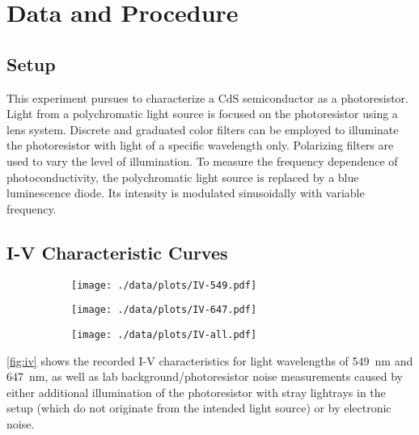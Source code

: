 \chapter{Data and Procedure}

\section{Setup}
This experiment pursues to characterize a CdS semiconductor as a photoresistor.
Light from a polychromatic light source is focused on the photoresistor using a lens system.
Discrete and graduated color filters can be employed to illuminate the photoresistor with light of a specific wavelength only.
Polarizing filters are used to vary the level of illumination.
To measure the frequency dependence of photoconductivity, the polychromatic light source is replaced by a blue luminescence diode.
Its intensity is modulated sinusoidally with variable frequency.

\section{I-V Characteristic Curves}
\begin{figure}
	\centering
	\begin{subfigure}{0.45\textwidth}
		\centering
		\texttt{[image: ./data/plots/IV-549.pdf]}
		\label{fig:iv-549}
	\end{subfigure}
	\begin{subfigure}{0.45\textwidth}
		\centering
		\texttt{[image: ./data/plots/IV-647.pdf]}
		\label{fig:iv-647}
	\end{subfigure}
  \par\bigskip
	\begin{subfigure}{0.7\textwidth}
		\centering
		\texttt{[image: ./data/plots/IV-all.pdf]}
		\label{fig:iv-all}
	\end{subfigure}
  \label{fig:iv}
\end{figure}

\autoref{fig:iv} shows the recorded I-V characteristics for light wavelengths of \SI{549}{\nm} and \SI{647}{\nm}, as well as lab background/photoresistor noise measurements caused by either additional illumination of the photoresistor with stray lightrays in the setup (which do not originate from the intended light source) or by electronic noise.

